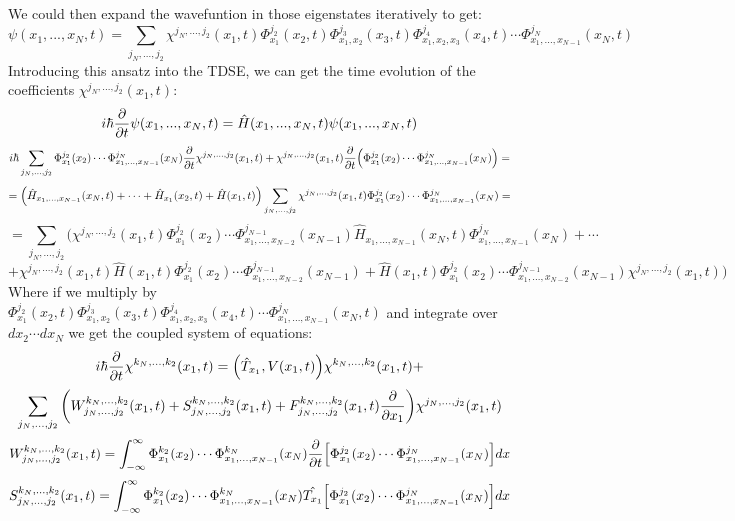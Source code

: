 \documentclass[11pt, a4paper]{article} %
\begin{document}
We could then expand the wavefuntion in those eigenstates iteratively to get:
\begin{equation}
\psi(x_1,...,x_N,t)=\sum_{j_N,...,j_2} \chi^{j_N,...,j_2}(x_1,t) \Phi^{j_2}_{x_1}(x_2,t) \Phi^{j_3}_{x_1,x_2}(x_3,t) \Phi^{j_4}_{x_1, x_2, x_3}(x_4,t)\cdots \Phi^{j_N}_{x_1,... ,x_{N-1}}(x_N, t)
\end{equation}
Introducing this ansatz into the TDSE, we can get the time evolution of the coefficients $\chi^{j_N,...,j_2}(x_1,t)$:
\begin{equation}
i\hbar\pdv{}{t}\psi(x_1,...,x_N,t)= \hat{H}(x_1,...,x_N,t)\psi(x_1,...,x_N,t)
\end{equation}
$$
i\hbar\sum_{j_N,...,j_2}  \Phi^{j_2}_{x_1}(x_2) \cdots \Phi^{j_N}_{x_1,... ,x_{N-1}}(x_N)\pdv{}{t}\chi^{j_N,...,j_2}(x_1,t) + \chi^{j_N,...,j_2}(x_1,t) \pdv{}{t}\qty(\Phi^{j_2}_{x_1}(x_2) \cdots \Phi^{j_N}_{x_1,... ,x_{N-1}}(x_N)) =
$$
$$
 =\qty( \hat{H}_{x_1,...,x_{N-1}}(x_N,t)+\cdots+\hat{H}_{x_1}(x_2,t)+ \hat{H}(x_1,t))\sum_{j_N,...,j_2} \chi^{j_N,...,j_2}(x_1,t) \Phi^{j_2}_{x_1}(x_2)\cdots \Phi^{j_N}_{x_1,... ,x_{N-1}}(x_N)=
$$
$$
 =\sum_{j_N,...,j_2}\Big(  \chi^{j_N,...,j_2}(x_1,t) \Phi^{j_2}_{x_1}(x_2)\cdots \Phi^{j_{N-1}}_{x_1,... ,x_{N-2}}(x_{N-1})\hat{H}_{x_1,...,x_{N-1}}(x_N,t)\Phi^{j_{N}}_{x_1,... ,x_{N-1}}(x_{N})+\cdots
$$
$$
+ \chi^{j_N,...,j_2}(x_1,t)\hat{H}(x_1,t)\Phi^{j_2}_{x_1}(x_2)\cdots \Phi^{j_{N-1}}_{x_1,... ,x_{N-2}}(x_{N-1})+ \hat{H}(x_1,t)\Phi^{j_2}_{x_1}(x_2)\cdots \Phi^{j_{N-1}}_{x_1,... ,x_{N-2}}(x_{N-1})\chi^{j_N,...,j_2}(x_1,t)\Big)
$$
Where if we multiply by $\Phi^{j_2}_{x_1}(x_2,t) \Phi^{j_3}_{x_1,x_2}(x_3,t) \Phi^{j_4}_{x_1, x_2, x_3}(x_4,t)\cdots \Phi^{j_N}_{x_1,... ,x_{N-1}}(x_N, t)$ and integrate over $dx_2\cdots dx_N$ we get the coupled system of equations:
\begin{equation}
i\hbar \pdv{}{t}\chi^{k_N,...,k_2}(x_1,t) = \qty(\hat{T}_{x_1}, V(x_1,t)) \chi^{k_N,...,k_2}(x_1,t)+
\end{equation}
$$
\sum_{j_N,...,j_2} \qty(W^{k_N,...,k_2}_{j_N,...,j_2}(x_1,t)+S^{k_N,...,k_2}_{j_N,...,j_2}(x_1,t)+F^{k_N,...,k_2}_{j_N,...,j_2}(x_1,t)\pdv{}{x_1} ) \chi^{j_N,...,j_2}(x_1,t)
$$
\begin{equation}
W^{k_N,...,k_2}_{j_N,...,j_2}(x_1,t)=\int_{-\infty}^{\infty}\Phi^{k_2}_{x_1}(x_2) \cdots \Phi^{k_N}_{x_1,... ,x_{N-1}}(x_N) \pdv{}{t}\qty[\Phi^{j_2}_{x_1}(x_2) \cdots \Phi^{j_N}_{x_1,... ,x_{N-1}}(x_N)]dx
\end{equation}
\begin{equation}
S^{k_N,...,k_2}_{j_N,...,j_2}(x_1,t)=\int_{-\infty}^{\infty}\Phi^{k_2}_{x_1}(x_2) \cdots \Phi^{k_N}_{x_1,... ,x_{N-1}}(x_N) \hat{T_{x_1}}\qty[\Phi^{j_2}_{x_1}(x_2) \cdots \Phi^{j_N}_{x_1,... ,x_{N-1}}(x_N)]dx
\end{equation}
\end{document}
